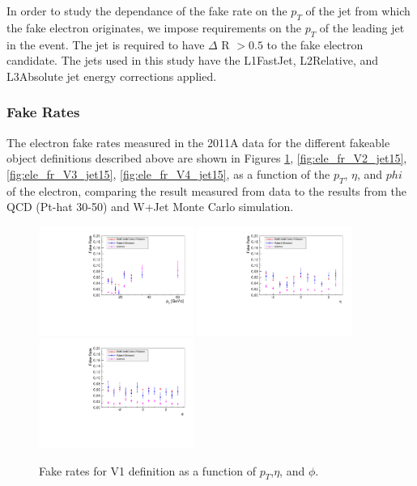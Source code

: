 In order to study the dependance of the fake rate on the $p_{T}$ of the jet from which
the fake electron originates, we impose requirements on the $p_{T}$ of the leading jet 
in the event. The jet is required to have $\Delta$ R $ > 0.5$ 
to the fake electron candidate. The jets used in this study have the L1FastJet, L2Relative, and
L3Absolute jet energy corrections applied. 

\subsubsection{Fake Rates}
The electron fake rates measured in the 2011A data for the different fakeable object 
definitions described above are shown in Figures \ref{fig:ele_fr_V1_jet15},
\ref{fig:ele_fr_V2_jet15}, \ref{fig:ele_fr_V3_jet15}, \ref{fig:ele_fr_V4_jet15}, as a function of the 
$p_{T}$, $\eta$, and $phi$ of the electron, comparing the result measured from data to the
results from the QCD (Pt-hat 30-50) and W+Jet Monte Carlo simulation.

\begin{figure}[!htbp]
\begin{center}
\includegraphics[width=0.45\textwidth]{figures/ElectronFakeRate_DenominatorV1_ptThreshold15_Pt.pdf}
\includegraphics[width=0.45\textwidth]{figures/ElectronFakeRate_DenominatorV1_ptThreshold15_Eta.pdf}
\includegraphics[width=0.45\textwidth]{figures/ElectronFakeRate_DenominatorV1_ptThreshold15_Phi.pdf}
\caption{Fake rates for V1 definition as a function of $p_T$,$\eta$, and $\phi$.}
\label{fig:ele_fr_V1_jet15}
\end{center}
\end{figure}

